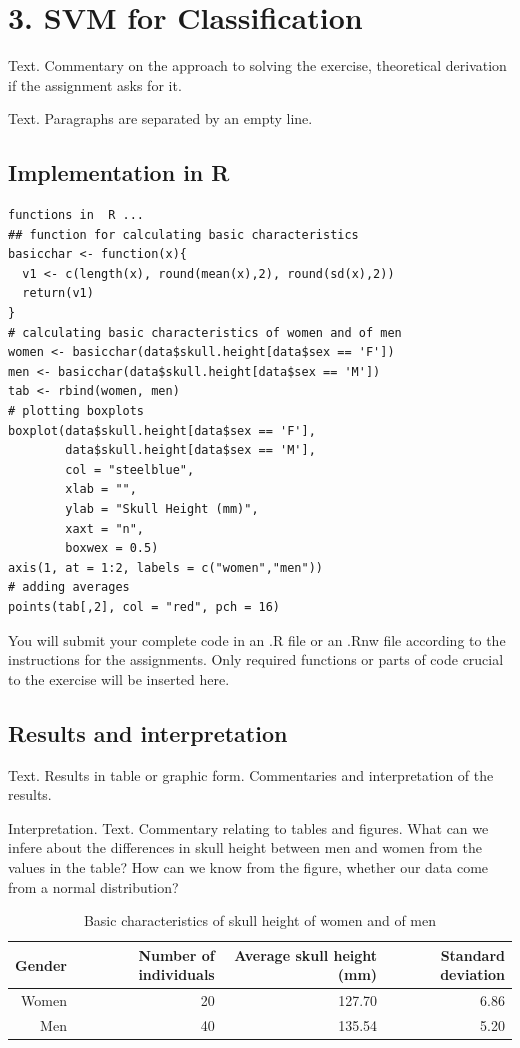 \section*{3. SVM for Classification}
\noindent Text. Commentary on the approach to solving the exercise, theoretical derivation if the assignment asks for it.

Text. Paragraphs are separated by an empty line. 

\subsection*{Implementation in R}
\begin{lstlisting}
functions in  R ...
## function for calculating basic characteristics
basicchar <- function(x){
  v1 <- c(length(x), round(mean(x),2), round(sd(x),2))
  return(v1)
}
# calculating basic characteristics of women and of men
women <- basicchar(data$skull.height[data$sex == 'F'])
men <- basicchar(data$skull.height[data$sex == 'M'])
tab <- rbind(women, men)
# plotting boxplots
boxplot(data$skull.height[data$sex == 'F'], 
        data$skull.height[data$sex == 'M'],
        col = "steelblue", 
        xlab = "",
        ylab = "Skull Height (mm)",
        xaxt = "n", 
        boxwex = 0.5)
axis(1, at = 1:2, labels = c("women","men"))
# adding averages
points(tab[,2], col = "red", pch = 16)
\end{lstlisting}

You will submit your complete code in an \textsf{.R} file or an \textsf{.Rnw} file according to the instructions for the assignments. Only required functions or parts of code crucial to the exercise will be inserted here.
\bigskip
\subsection*{Results and interpretation}
\noindent Text. Results in table or graphic form. Commentaries and interpretation of the results.

 Interpretation. Text. Commentary relating to tables and figures. What can we infere about the differences in skull height between men and women from the values in the table? How can we know from the figure, whether our data come from a normal distribution?

\begin{table}[ht]
\footnotesize
\centering

\begin{tabular}{r||rrr}
 Gender & Number of individuals & Average skull height (mm) & Standard deviation \\ 
 \hline \hline
Women & 20 & 127.70 & 6.86 \\ 
Men & 40 & 135.54 & 5.20 \\ 
\end{tabular}
\caption{Basic characteristics of skull height of women and of men}
\end{table}


